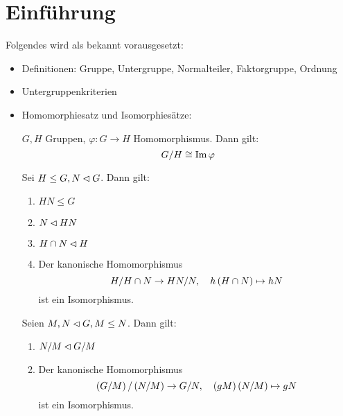 \section{Einf\"uhrung}
Folgendes wird als bekannt vorausgesetzt:
\begin{itemize}
 \item Definitionen: Gruppe, Untergruppe, Normalteiler, Faktorgruppe, Ordnung

 \item Untergruppenkriterien
 \item Homomorphiesatz und Isomorphies\"atze:
  \begin{satz}[Homomorphiesatz]
   \label{homomorphiesatz}
   $G, H$ Gruppen, $\varphi: G \to H$ Homomorphismus. Dann gilt: 
   \begin{equation*} 
    G/ H \cong \operatorname{Im} \varphi
   \end{equation*}
  \end{satz}
  \begin{satz}[1. Isomorphiesatz]
  \label{isomorphiesatz1}
   Sei $H\leq G, N \lhd G$. Dann gilt:
   \begin{enumerate}
    \item $HN \leq G$
    \item $N \lhd HN$
    \item $H \cap N \lhd H$
    \item Der kanonische Homomorphismus
     \begin{equation*}
      H/H\cap N \to HN/N, \quad h\left(H\cap N\right) \mapsto hN
     \end{equation*}
     ist ein Isomorphismus.
   \end{enumerate}
  \end{satz}
  \begin{satz}[2. Isomorphiesatz]
  \label{isomorphiesatz2}
   Seien $M, N \lhd G, M\leq N$. Dann gilt:
   \begin{enumerate}
    \item $N/M \lhd G/M$
    \item Der kanonische Homomorphismus
     \begin{equation*}
      \left(G/M\right)/\left(N/M\right) \to G/N, \quad \left(gM\right)\left(N/M\right) \mapsto gN
     \end{equation*}
     ist ein Isomorphismus.
   \end{enumerate}
  \end{satz}

\end{itemize}
